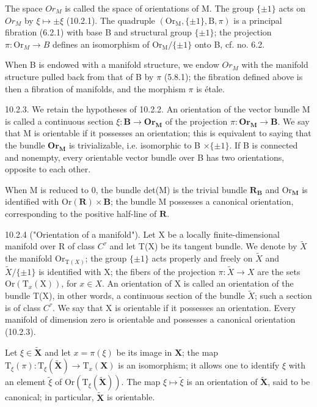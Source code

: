 The space \(Or_{M}\) is called the space of orientations of M. The group \(\{\pm1\}\) acts on \(Or_{M}\) by \(\xi\mapsto\pm\xi\) (10.2.1). The quadruple \((\mathrm{Or}_{\mathrm{M}},\{\pm1\},\mathrm{B},\pi)\) is a principal fibration (6.2.1) with base B and structural group \(\{\pm1\}\); the projection \(\pi:\mathrm{Or}_{M}\to B\) defines an isomorphism of \(\mathrm{Or}_{\mathrm{M}}/\{\pm1\}\) onto B, cf. no. 6.2.

When B is endowed with a manifold structure, we endow \(Or_{M}\) with the manifold structure pulled back from that of B by \(\pi\) (5.8.1); the fibration defined above is then a fibration of manifolds, and the morphism \(\pi\) is étale.

10.2.3. We retain the hypotheses of 10.2.2. An orientation of the vector bundle M is called a continuous section \(\xi\colon\mathbf{B}\to\mathbf{O}\mathbf{r}_{\mathbf{M}}\) of the projection \(\pi\colon\mathbf{O}\mathbf{r}_{\mathbf{M}}\to\mathbf{B}\). We say that M is orientable if it possesses an orientation; this is equivalent to saying that the bundle \(\mathbf{O}\mathbf{r}_{\mathbf{M}}\) is trivializable, i.e. isomorphic to B \(\times\{\pm1\}\). If B is connected and nonempty, every orientable vector bundle over B has two orientations, opposite to each other.

When M is reduced to 0, the bundle det(M) is the trivial bundle \(\mathbf{R}_{\mathbf{B}}\) and \(\mathrm{Or}_{\mathbf{M}}\) is identified with \(\mathrm{Or}(\mathbf{R}) \times \mathbf{B}\); the bundle M possesses a canonical orientation, corresponding to the positive half-line of \(\mathbf{R}\).

10.2.4 ("Orientation of a manifold"). Let X be a locally finite-dimensional manifold over R of class \(C^{\tau}\) and let T(X) be its tangent bundle. We denote by \(\tilde{X}\) the manifold \(\mathrm{Or}_{\mathrm{T}(X)}\); the group \(\{\pm1\}\) acts properly and freely on \(\tilde{X}\) and \(\tilde{X}/\{\pm1\}\) is identified with X; the fibers of the projection \(\pi: \tilde{X} \to X\) are the sets \(\mathrm{Or}(\mathrm{T}_{x}(\mathrm{X}))\), for \(x \in X\). An orientation of X is called an orientation of the bundle T(X), in other words, a continuous section of the bundle \(\tilde{X}\); such a section is of class \(C^{\tau}\). We say that X is orientable if it possesses an orientation. Every manifold of dimension zero is orientable and possesses a canonical orientation (10.2.3).

Let \(\xi\in\tilde{\mathbf{X}}\) and let \(x=\pi(\xi)\) be its image in \(\mathbf{X}\); the map \(\mathrm{T}_{\xi}(\pi):\mathrm{T}_{\xi}(\tilde{\mathbf{X}})\to\mathrm{T}_{x}(\mathbf{X})\) is an isomorphism; it allows one to identify \(\xi\) with an element \(\tilde{\xi}\) of \(\mathrm{Or}(\mathrm{T}_{\xi}(\tilde{\mathbf{X}}))\). The map \(\xi\mapsto\tilde{\xi}\) is an orientation of \(\tilde{\mathbf{X}}\), said to be canonical; in particular, \(\tilde{\mathbf{X}}\) is orientable.

